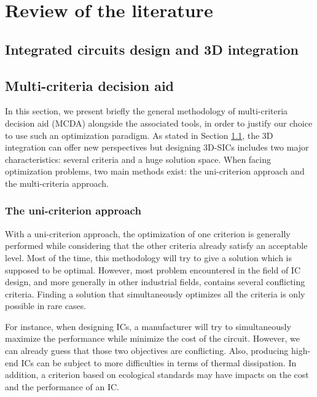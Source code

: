 \chapter{Review of the literature}
\label{cha:rol}

\section{Integrated circuits design and 3D integration}
\label{sec:rol.icdesign}

\section{Multi-criteria decision aid}
\label{sec:rol.mcda}

In this section, we present briefly the general methodology of multi-criteria decision aid (MCDA) alongside the associated tools, in order to justify our choice to use such an optimization paradigm. As stated in Section \ref{sec:rol.icdesign}, the 3D integration can offer new perspectives but designing 3D-SICs includes two major characteristics: several criteria and a huge solution space. When facing optimization problems, two main methods exist: the uni-criterion approach and the multi-criteria approach.

\subsection{The uni-criterion approach}
\label{subsec:rol.unicrit_approach}

With a uni-criterion approach, the optimization of one criterion is generally performed while considering that the other criteria already satisfy an acceptable level. Most of the time, this methodology will try to give a solution which is supposed to be optimal. However, most problem encountered in the field of IC design, and more generally in other industrial fields, contains several conflicting criteria. Finding a solution that simultaneously optimizes all the criteria is only possible in rare cases.

For instance, when designing ICs, a manufacturer will try to simultaneously maximize the performance while minimize the cost of the circuit. However, we can already guess that those two objectives are conflicting. Also, producing high-end ICs can be subject to more difficulties in terms of thermal dissipation. In addition, a criterion based on ecological standards may have impacts on the cost and the performance of an IC.

